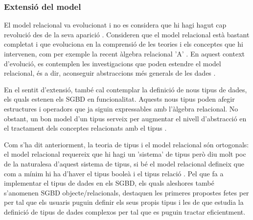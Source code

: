 


\subsubsection{Extensió del model}

El model relacional va evolucionat i no es considera que hi hagi hagut
cap revolució des de la seva aparició
\parencite[cap.~19]{date06}. %
Consideren que el model relacional està bastant completat i que
evoluciona en la comprensió de les teories i els conceptes que hi
intervenen, com per exemple la recent àlgebra relacional
'A' \parencite[ap.~A]{date06:_datab_types_relat_model}.  En aquest
context d'evolució, es contemplen les investigacions que poden
estendre el model relacional, és a dir, aconseguir abstraccions més
generals de les dades \parencite[cap.~25]{date06}. %


En el sentit d'extensió, també cal contemplar la definició de nous
tipus de dades, els quals estenen els SGBD en funcionalitat.  Aquests
nous tipus poden afegir estructures i operadors que ja siguin
expressables amb l'àlgebra relacional. No obstant, un bon model d'un
tipus serveix per augmentar el nivell d'abstracció en el tractament dels
conceptes relacionats amb el
tipus \parencite{date02:_tempor_data_relat_model}. %

Com s'ha dit anteriorment, la teoria de tipus i el model relacional
són ortogonals: el model relacional requereix que hi hagi un 'sistema'
de tipus però diu molt poc de la naturalesa d'aquest sistema de tipus,
si bé el model relacional defineix que com a mínim hi ha d'haver el
tipus booleà i el tipus relació \parencite{date:thethirdmanifesto}. Pel que
fa a implementar el tipus de dades en els SGBD, els quals aleshores
també s'anomenen SGBD objecte/relacionals, destaquen les primeres
propostes fetes per \textcite{stonebraker86} per tal que els usuaris
puguin definir els seus propis tipus i les de
\textcite{seshadri98:_enhan} que estudia la definició de tipus de
dades complexos per tal que es puguin tractar eficientment.




